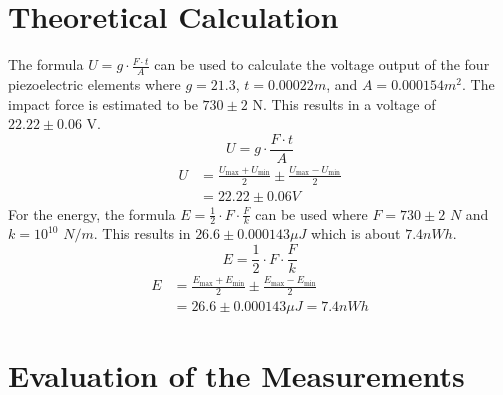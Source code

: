 \section{Theoretical Calculation}

The formula $U = g \cdot \frac{F \cdot t}{A}$ can be used to calculate the voltage output of the four piezoelectric elements where $g = 21.3$, $t = 0.00022m$, and $A = 0.000154m^2$. The impact force is estimated to be $730 \pm 2$ N. This results in a voltage of $22.22 \pm 0.06$ V. 
$$
U = g \cdot \frac{F \cdot t}{A}
$$
\begin{equation*}
    \begin{split}
    U & = \frac{U_{\text{max}}+ U_{\text{min}}}{2} \pm \frac{U_{\text{max}}- U_{\text{min}}}{2}\\
    & = 22.22 \pm 0.06 V
    \end{split}
\end{equation*}
For the energy, the formula $E = \frac{1}{2} \cdot F \cdot \frac{F}{k}$ can be used where $F = 730 \pm 2$ $N$ and $k = 10^{10}$ $N/m$. This results in $26.6 \pm 0.000143 \mu J$ which is about $7.4 nWh$.
$$
E = \frac{1}{2} \cdot F \cdot \frac{F}{k}
$$
\begin{equation*}
    \begin{split}
    E & = \frac{E_{\text{max}}+ E_{\text{min}}}{2} \pm \frac{E_{\text{max}}- E_{\text{min}}}{2}\\
    & = 26.6 \pm 0.000143 \mu J = 7.4 nWh
    \end{split}
\end{equation*}

\section{Evaluation of the Measurements}


